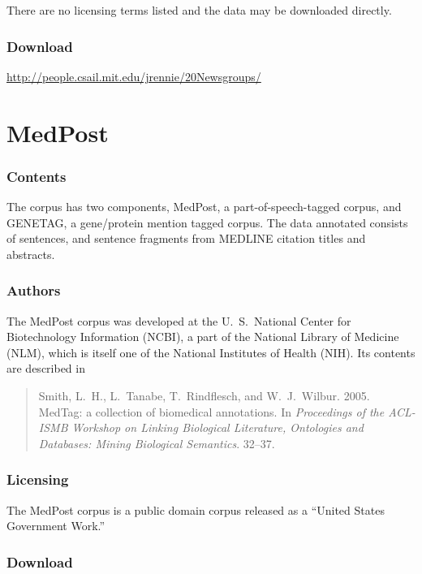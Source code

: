 There are no licensing terms listed and the data may be downloaded
directly.

\subsubsection{Download}

\url{http://people.csail.mit.edu/jrennie/20Newsgroups/}




\section{MedPost}\label{section:corpora-medpost}

\subsubsection{Contents}

The corpus has two components, MedPost, a part-of-speech-tagged
corpus, and GENETAG, a gene/protein mention tagged corpus.  The data
annotated consists of sentences, and sentence fragments from MEDLINE
citation titles and abstracts.

\subsubsection{Authors}

The MedPost corpus was developed at the U.~S.~National Center for
Biotechnology Information (NCBI), a part of the National Library of
Medicine (NLM), which is itself one of the National Institutes of
Health (NIH).  Its contents are described in
%
\begin{quote}
Smith, L.~H., L.~Tanabe, T.~Rindflesch, and W.~J.~Wilbur.
2005. MedTag: a collection of biomedical annotations.  In {\it
  Proceedings of the ACL-ISMB Workshop on Linking Biological
  Literature, Ontologies and Databases: Mining Biological
  Semantics}. 32--37.
\end{quote}

\subsubsection{Licensing}

The MedPost corpus is a public domain corpus released as a ``United
States Government Work.''

\subsubsection{Download}

